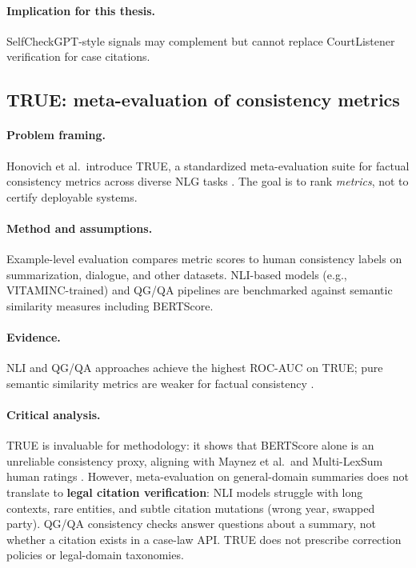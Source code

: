 \paragraph{Implication for this thesis.}
SelfCheckGPT-style signals may complement but cannot replace CourtListener verification for case citations.

\subsection{TRUE: meta-evaluation of consistency metrics}
\label{sec:lit-true}

\paragraph{Problem framing.}
Honovich et al.\ introduce TRUE, a standardized meta-evaluation suite for factual consistency metrics across diverse NLG tasks \cite{honovich2022true}. The goal is to rank \emph{metrics}, not to certify deployable systems.

\paragraph{Method and assumptions.}
Example-level evaluation compares metric scores to human consistency labels on summarization, dialogue, and other datasets. NLI-based models (e.g., VITAMINC-trained) and QG/QA pipelines are benchmarked against semantic similarity measures including BERTScore.

\paragraph{Evidence.}
NLI and QG/QA approaches achieve the highest ROC-AUC on TRUE; pure semantic similarity metrics are weaker for factual consistency \cite{honovich2022true}.

\paragraph{Critical analysis.}
TRUE is invaluable for methodology: it shows that BERTScore alone is an unreliable consistency proxy, aligning with Maynez et al.\ and Multi-LexSum human ratings \cite{maynez2020faithfulness,shen2022multilexsum}. However, meta-evaluation on general-domain summaries does not translate to \textbf{legal citation verification}: NLI models struggle with long contexts, rare entities, and subtle citation mutations (wrong year, swapped party). QG/QA consistency checks answer questions about a summary, not whether a citation exists in a case-law API. TRUE does not prescribe correction policies or legal-domain taxonomies.

